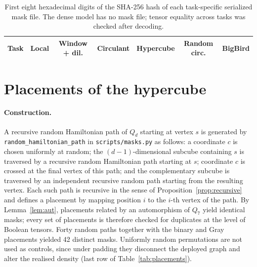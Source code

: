 \documentclass[10pt]{article}
\begin{document}
\begin{table}[H]
\centering
\caption{First eight hexadecimal digits of the SHA-256 hash of each task-specific serialized mask file. The dense model has no mask file; tensor equality across tasks was checked after decoding.}
\scriptsize
\begin{tabular}{lcccccc}
\toprule
Task & Local & Window + dil. & Circulant & Hypercube & Random circ. & BigBird \\
\midrule

\end{tabular}
\end{table}

\section{Placements of the hypercube}
\label{app:placements}

\paragraph{Construction.} A recursive random Hamiltonian path of $Q_d$ starting at vertex $s$ is generated by \texttt{random\_hamiltonian\_path} in \texttt{scripts/masks.py} as follows: a coordinate $c$ is chosen uniformly at random; the $(d-1)$-dimensional subcube containing $s$ is traversed by a recursive random Hamiltonian path starting at $s$; coordinate $c$ is crossed at the final vertex of this path; and the complementary subcube is traversed by an independent recursive random path starting from the resulting vertex. Each such path is recursive in the sense of Proposition~\ref{prop:recursive} and defines a placement by mapping position $i$ to the $i$-th vertex of the path. By Lemma~\ref{lem:aut}, placements related by an automorphism of $Q_7$ yield identical masks; every set of placements is therefore checked for duplicates at the level of Boolean tensors. Forty random paths together with the binary and Gray placements yielded 42 distinct masks. Uniformly random permutations are not used as controls, since under padding they disconnect the deployed graph and alter the realised density (last row of Table~\ref{tab:placements}).
\end{document}
